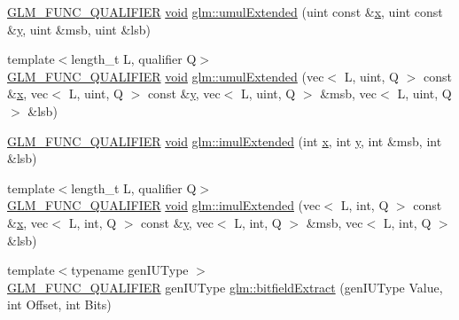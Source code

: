 \begin{DoxyCompactItemize}
\item 
\hyperlink{setup_8hpp_a33fdea6f91c5f834105f7415e2a64407}{G\+L\+M\+\_\+\+F\+U\+N\+C\+\_\+\+Q\+U\+A\+L\+I\+F\+I\+ER} \hyperlink{_s_d_l__opengles2__gl2ext_8h_ae5d8fa23ad07c48bb609509eae494c95}{void} \hyperlink{namespaceglm_a8d2521311c96c4b426be9857010b6b76}{glm\+::umul\+Extended} (uint const \&\hyperlink{_s_d_l__opengl_8h_ad0e63d0edcdbd3d79554076bf309fd47}{x}, uint const \&\hyperlink{_s_d_l__opengl_8h_a1675d9d7bb68e1657ff028643b4037e3}{y}, uint \&msb, uint \&lsb)
\item 
{\footnotesize template$<$length\+\_\+t L, qualifier Q$>$ }\\\hyperlink{setup_8hpp_a33fdea6f91c5f834105f7415e2a64407}{G\+L\+M\+\_\+\+F\+U\+N\+C\+\_\+\+Q\+U\+A\+L\+I\+F\+I\+ER} \hyperlink{_s_d_l__opengles2__gl2ext_8h_ae5d8fa23ad07c48bb609509eae494c95}{void} \hyperlink{group__core__func__integer_ga732e2fb56db57ea541c7e5c92b7121be}{glm\+::umul\+Extended} (vec$<$ L, uint, Q $>$ const \&\hyperlink{_s_d_l__opengl_8h_ad0e63d0edcdbd3d79554076bf309fd47}{x}, vec$<$ L, uint, Q $>$ const \&\hyperlink{_s_d_l__opengl_8h_a1675d9d7bb68e1657ff028643b4037e3}{y}, vec$<$ L, uint, Q $>$ \&msb, vec$<$ L, uint, Q $>$ \&lsb)
\item 
\hyperlink{setup_8hpp_a33fdea6f91c5f834105f7415e2a64407}{G\+L\+M\+\_\+\+F\+U\+N\+C\+\_\+\+Q\+U\+A\+L\+I\+F\+I\+ER} \hyperlink{_s_d_l__opengles2__gl2ext_8h_ae5d8fa23ad07c48bb609509eae494c95}{void} \hyperlink{namespaceglm_a940501aa5c66bc19f9ba6ddfe0110097}{glm\+::imul\+Extended} (int \hyperlink{_s_d_l__opengl_8h_ad0e63d0edcdbd3d79554076bf309fd47}{x}, int \hyperlink{_s_d_l__opengl_8h_a1675d9d7bb68e1657ff028643b4037e3}{y}, int \&msb, int \&lsb)
\item 
{\footnotesize template$<$length\+\_\+t L, qualifier Q$>$ }\\\hyperlink{setup_8hpp_a33fdea6f91c5f834105f7415e2a64407}{G\+L\+M\+\_\+\+F\+U\+N\+C\+\_\+\+Q\+U\+A\+L\+I\+F\+I\+ER} \hyperlink{_s_d_l__opengles2__gl2ext_8h_ae5d8fa23ad07c48bb609509eae494c95}{void} \hyperlink{group__core__func__integer_gac0c510a70e852f57594a9141848642e3}{glm\+::imul\+Extended} (vec$<$ L, int, Q $>$ const \&\hyperlink{_s_d_l__opengl_8h_ad0e63d0edcdbd3d79554076bf309fd47}{x}, vec$<$ L, int, Q $>$ const \&\hyperlink{_s_d_l__opengl_8h_a1675d9d7bb68e1657ff028643b4037e3}{y}, vec$<$ L, int, Q $>$ \&msb, vec$<$ L, int, Q $>$ \&lsb)
\item 
{\footnotesize template$<$typename gen\+I\+U\+Type $>$ }\\\hyperlink{setup_8hpp_a33fdea6f91c5f834105f7415e2a64407}{G\+L\+M\+\_\+\+F\+U\+N\+C\+\_\+\+Q\+U\+A\+L\+I\+F\+I\+ER} gen\+I\+U\+Type \hyperlink{namespaceglm_ab781f965cc1130fc70a0a8aaf50e6813}{glm\+::bitfield\+Extract} (gen\+I\+U\+Type Value, int Offset, int Bits)

\end{DoxyCompactItemize}
